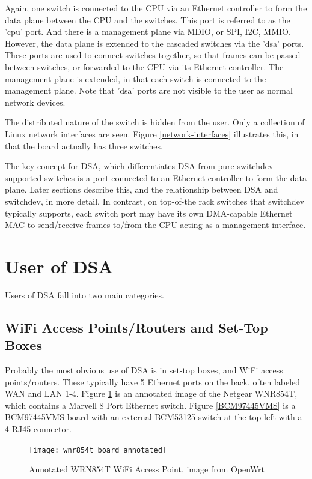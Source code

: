 \documentclass[letterpaper]{article}
\begin{document}
Again, one switch is connected to the CPU via an Ethernet controller
to form the data plane between the CPU and the switches. This port is
referred to as the 'cpu' port. And there is a management plane via
MDIO, or SPI, I2C, MMIO. However, the data plane is extended to the
cascaded switches via the 'dsa' ports. These ports are used to connect
switches together, so that frames can be passed between switches, or
forwarded to the CPU via its Ethernet controller. The management plane
is extended, in that each switch is connected to the management plane.
Note that 'dsa' ports are not visible to the user as normal network
devices.

The distributed nature of the switch is hidden from the user. Only a
collection of Linux network interfaces are seen. Figure
\ref{network-interfaces} illustrates this, in that the board actually
has three switches.

The key concept for DSA, which differentiates DSA from pure switchdev
supported switches is a port connected to an Ethernet controller to
form the data plane. Later sections describe this, and the
relationship between DSA and switchdev, in more detail. In contrast,
on top-of-the rack switches that switchdev typically supports, each
switch port may have its own DMA-capable Ethernet MAC to send/receive
frames to/from the CPU acting as a management interface.

\section{User of DSA}

Users of DSA fall into two main categories.

\subsection{WiFi Access Points/Routers and Set-Top Boxes}

Probably the most obvious use of DSA is in set-top boxes, and WiFi
access points/routers. These typically have 5 Ethernet ports on the
back, often labeled WAN and LAN 1-4. Figure \ref{wrn854t} is an
annotated image of the Netgear WNR854T, which contains a Marvell 8
Port Ethernet switch. Figure \ref{BCM97445VMS} is a BCM97445VMS board
with an external BCM53125 switch at the top-left with a 4-RJ45
connector.

\begin{figure}[ht]
  \centering
  \texttt{[image: wnr854t\_board\_annotated]}
  \caption{Annotated WRN854T WiFi Access Point, image from OpenWrt}
  \label{wrn854t}
\end{figure}
\end{document}
